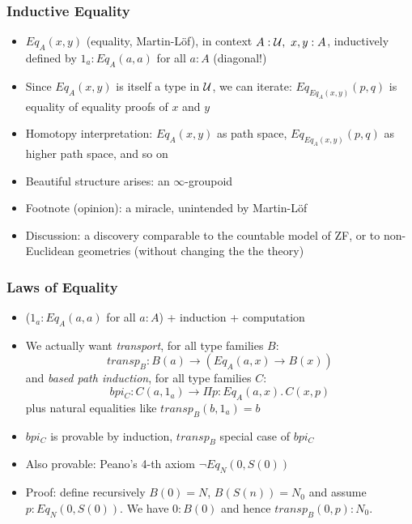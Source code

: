 \documentclass[handout]{beamer}
\newcommand{\depi}[3]{\Pi{#1{:}#2.\,#3}}
\newcommand{\sigm}[3]{\Sigma{#1{:}#2.\,#3}}
\newcommand{\UU}{{\cal U}}
\begin{document}
 \frame
  {
  
    \frametitle{Inductive Equality}

    \begin{itemize}[<+->]
    \item $Eq_A(x,y)$ (equality, Martin-L\"of), in context $A:\UU,~x,y:A$, 
    inductively defined by $1_a : Eq_A(a,a)$ for all $a:A$ (diagonal!)
    \item Since $Eq_A(x,y)$ is itself a type in $\UU$, we can iterate:
    $Eq_{Eq_A(x,y)}(p,q)$ is equality of equality proofs of $x$ and $y$
    \item Homotopy interpretation: $Eq_A(x,y)$ as path space, 
$Eq_{Eq_A(x,y)}(p,q)$ as higher path space, and so on
   \item Beautiful structure arises: an $\infty$-groupoid
   \item Footnote (opinion): a miracle, unintended by Martin-L\"of
   \item Discussion: a discovery comparable to the  countable model of ZF, 
   or to non-Euclidean geometries (without changing the the theory)
    \end{itemize}
  }

 \frame
  {
  
    \frametitle{Laws of Equality}

    \begin{itemize}[<+->]
    \item ($1_a : Eq_A(a,a)$ for all $a:A$) + induction + computation
    \item We actually want \emph{transport}, for all type families $B$:
    \[ transp_B : B(a) \to (Eq_A(a,x) \to B(x))  \]
    and \emph{based path induction}, for all type families $C$:
    \[ bpi_C : C(a,1_a) \to \depi{p}{Eq_A(a,x)}{ C(x,p)}  \]
    plus natural equalities like $transp_B(b,1_a) = b$
    \item $bpi_C$ is provable by induction, $transp_B$ special case of $bpi_C$
    \item Also provable: Peano's 4-th axiom $\neg Eq_N(0,S(0))$
    \item Proof: define recursively $B(0)=N$, $B(S(n))=N_0$ and assume
    $p:Eq_N(0,S(0))$. We have $0:B(0)$  and hence $transp_B(0,p) : N_0$.
    \end{itemize}
  }
\end{document}
